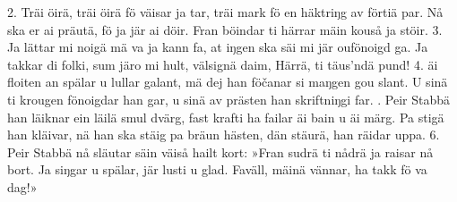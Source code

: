 \setlength{\columnsep}{0.5cm}
\begin{multicols}{2}
2.  Träi öirä, träi öirä fö väisar ja tar,
    träi mark fö en häktriŋg av förtiä par.
    Nå ska er ai präutä, fö ja jär ai döir.
    Fran böindar ti härrar mäin kouså ja stöir.
3.  Ja lättar mi noigä mä va ja kann fa,
    at iŋgen ska säi mi jär oufönoigd ga.
    Ja takkar di folki, sum järo mi hult,
    välsignä daim, Härrä, ti täus’ndä pund!
4.  äi floiten an spälar u lullar galant,
    mä dej han föčanar si maŋgen gou slant.
    U sinä ti krougen fönoigdar han gar,
    u sinä av prästen han skriftniŋgi far.
\vfill{}.  Peir Stabbä han läiknar ein läilä smul dvärg,
    fast krafti ha failar äi bain u äi märg.
    Pa stigä han kläivar, nä han ska stäig pa
    bräun hästen, dän stäurä, han räidar uppa.
6.  Peir Stabbä nå släutar säin väiså hailt kort:
    »Fran sudrä ti nådrä ja raisar nå bort.
    Ja siŋgar u spälar, jär lusti u glad.
    Faväll, mäinä vännar, ha takk fö va dag!»
\end{multicols}
